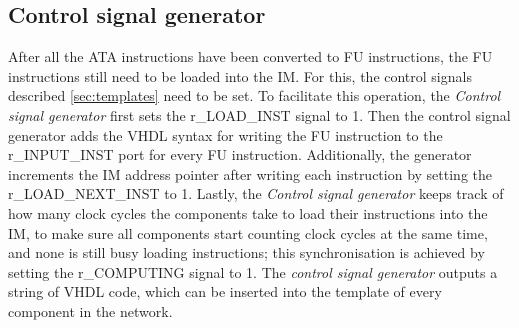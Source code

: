\subsection*{Control signal generator}
After all the ATA instructions have been converted to FU instructions, the FU instructions still need to be loaded into the IM. For this, the control signals described \ref{sec:templates} need to be set. To facilitate this operation, the \textit{Control signal generator} first sets the r\_LOAD\_INST signal to 1. %
Then the control signal generator adds the VHDL syntax for writing the FU instruction to the r\_INPUT\_INST port for every FU instruction. Additionally, the generator increments the IM address pointer after writing each instruction by setting the r\_LOAD\_NEXT\_INST to 1. Lastly, the \textit{Control signal generator} keeps track of how many clock cycles the components take to
load their instructions into the IM, to make sure all components start counting clock cycles at the same time, and none is still busy loading instructions; this synchronisation is achieved by setting the r\_COMPUTING signal to 1. The \textit{control signal generator} outputs a string of VHDL code, which can be inserted into the template of every component in the network. %


